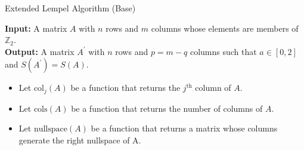 \documentclass{article}
\theoremstyle{definition}
\theoremstyle{problem}
\theoremstyle{lemma}
\begin{document}
		\begin{algorithm}
			\label{al_1}
			\caption{Extended Lempel Algorithm (Base)}
			\textbf{Input:} A matrix $A$ with $n$ rows and $m$ columns whose elements are members of $\mathbb{Z}_2$.\\
			\textbf{Output:} A matrix $A^\prime$ with $n$ rows and $p = m-q$ columns such that $a\in\left[0,2\right]$ and $S(A^\prime) = S(A)$.
			\begin{itemize}
				\item Let $\text{col}_j(A)$ be a function that returns the $j^{\text{th}}$ column of $A$.
				\item Let $\text{cols}(A)$ be a function that returns the number of columns of $A$.
				\item Let $\text{nullspace}(A)$ be a function that returns a matrix whose columns generate the right nullspace of A.
			\end{itemize}
			\begin{algorithmic}[1]
				\EndIf
				\EndIf
				\EndFor
				\EndFor
				\EndProcedure
			\end{algorithmic}
		\end{algorithm}
\end{document}
